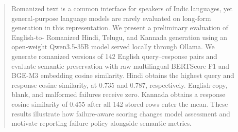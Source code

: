 \begin{abstract}
Romanized text is a common interface for speakers of Indic languages, yet
general-purpose language models are rarely evaluated on long-form generation
in this representation. We present a preliminary evaluation of English-to-
Romanized Hindi, Telugu, and Kannada generation using an open-weight
Qwen3.5-35B model served locally through Ollama. We generate romanized versions
of 142 English query--response pairs and evaluate semantic preservation with
raw multilingual BERTScore F1 and BGE-M3 embedding cosine similarity. Hindi
obtains the highest query and response cosine similarity, at 0.735 and 0.787,
respectively. English-copy, blank, and malformed failures receive zero. Kannada
obtains a response cosine similarity of 0.455 after all 142 stored rows enter
the mean. These results illustrate how failure-aware scoring changes model
assessment and motivate reporting failure policy alongside semantic metrics.
\end{abstract}
